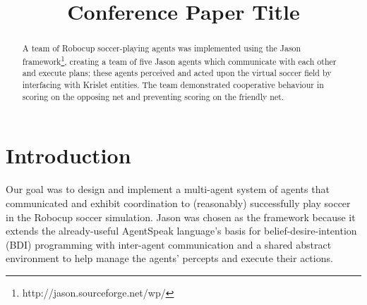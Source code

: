 \documentclass[conference]{IEEEtran}
\begin{document}
\title{Conference Paper Title}

\author{
\and
{}
\and
{}
\and
{}
}

\maketitle

\begin{abstract}
A team of Robocup soccer-playing agents was implemented using the Jason framework\footnote{http://jason.sourceforge.net/wp/}, creating a team of five Jason agents which communicate with each other and execute plans; these agents perceived and acted upon the virtual soccer field by interfacing with Krislet entities. The team demonstrated cooperative behaviour in scoring on the opposing net and preventing scoring on the friendly net.
\end{abstract}

\section{Introduction}
Our goal was to design and implement a multi-agent system of agents that communicated and exhibit coordination to (reasonably) successfully play soccer in the Robocup soccer simulation. Jason was chosen as the framework because it extends the already-useful AgentSpeak language’s basis for belief-desire-intention (BDI) programming with inter-agent communication and a shared abstract environment to help manage the agents’ percepts and execute their actions. 
\end{document}
